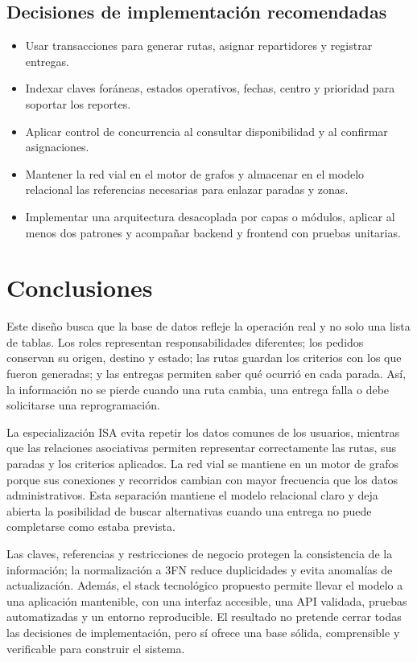 \documentclass[12pt,a4paper]{article}
\begin{document}
\subsection{Decisiones de implementación recomendadas}
\begin{itemize}
\item Usar transacciones para generar rutas, asignar repartidores y registrar entregas.
\item Indexar claves foráneas, estados operativos, fechas, centro y prioridad para soportar los reportes.
\item Aplicar control de concurrencia al consultar disponibilidad y al confirmar asignaciones.
\item Mantener la red vial en el motor de grafos y almacenar en el modelo relacional las referencias necesarias para enlazar paradas y zonas.
\item Implementar una arquitectura desacoplada por capas o módulos, aplicar al menos dos patrones y acompañar backend y frontend con pruebas unitarias.
\end{itemize}

\section{Conclusiones}
Este diseño busca que la base de datos refleje la operación real y no solo una lista de tablas. Los roles representan responsabilidades diferentes; los pedidos conservan su origen, destino y estado; las rutas guardan los criterios con los que fueron generadas; y las entregas permiten saber qué ocurrió en cada parada. Así, la información no se pierde cuando una ruta cambia, una entrega falla o debe solicitarse una reprogramación.

La especialización ISA evita repetir los datos comunes de los usuarios, mientras que las relaciones asociativas permiten representar correctamente las rutas, sus paradas y los criterios aplicados. La red vial se mantiene en un motor de grafos porque sus conexiones y recorridos cambian con mayor frecuencia que los datos administrativos. Esta separación mantiene el modelo relacional claro y deja abierta la posibilidad de buscar alternativas cuando una entrega no puede completarse como estaba prevista.

Las claves, referencias y restricciones de negocio protegen la consistencia de la información; la normalización a 3FN reduce duplicidades y evita anomalías de actualización. Además, el stack tecnológico propuesto permite llevar el modelo a una aplicación mantenible, con una interfaz accesible, una API validada, pruebas automatizadas y un entorno reproducible. El resultado no pretende cerrar todas las decisiones de implementación, pero sí ofrece una base sólida, comprensible y verificable para construir el sistema.
\end{document}
